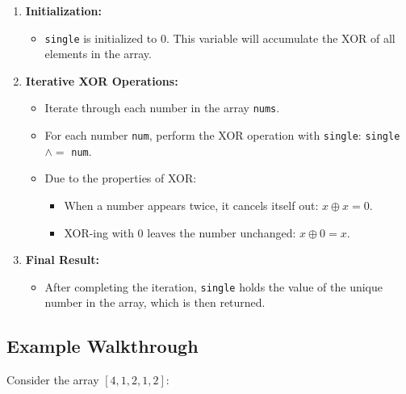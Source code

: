 \begin{enumerate}
    \item \textbf{Initialization:}
    \begin{itemize}
        \item \texttt{single} is initialized to 0. This variable will accumulate the XOR of all elements in the array.
    \end{itemize}
    
    \item \textbf{Iterative XOR Operations:}
    \begin{itemize}
        \item Iterate through each number in the array \texttt{nums}.
        \item For each number \texttt{num}, perform the XOR operation with \texttt{single}: \texttt{single} $\mathtt{\wedge}=$ \texttt{num}.
        \item Due to the properties of XOR:
        \begin{itemize}
            \item When a number appears twice, it cancels itself out: \(x \oplus x = 0\).
            \item XOR-ing with 0 leaves the number unchanged: \(x \oplus 0 = x\).
        \end{itemize}
    \end{itemize}
    
    \item \textbf{Final Result:}
    \begin{itemize}
        \item After completing the iteration, \texttt{single} holds the value of the unique number in the array, which is then returned.
    \end{itemize}
\end{enumerate}

\subsection*{Example Walkthrough}

Consider the array \([4,1,2,1,2]\):

